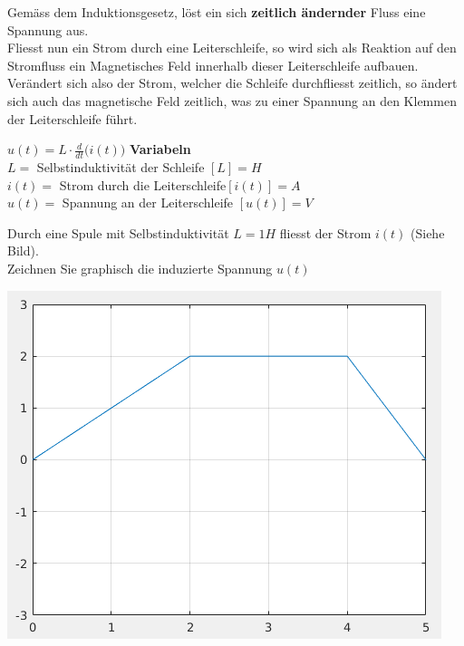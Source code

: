 \newpage



Gemäss dem Induktionsgesetz, löst ein sich \textbf{zeitlich ändernder} Fluss eine Spannung aus. \\
Fliesst nun ein Strom durch eine Leiterschleife, so wird sich als Reaktion auf den Stromfluss ein Magnetisches Feld innerhalb dieser Leiterschleife aufbauen.  \\
Verändert sich also der Strom, welcher die Schleife durchfliesst zeitlich, so ändert sich auch das magnetische Feld zeitlich, was zu einer Spannung an den Klemmen der Leiterschleife führt.

\begingl
\begin{center}

\fspace

\end{center}


\formulaBegin
$u(t) = L \cdot \frac{d}{dt}\big( i(t) \big) $
\formulaEnd
\textbf{Variabeln} \\
$L =$ Selbstinduktivität der Schleife $ [L] = H$ \\
$i(t) =$ Strom durch die Leiterschleife$ [i(t)] = A$ \\
$u(t) = $ Spannung an der Leiterschleife $[u(t)] = V$
\iend

\beginbsp
Durch eine Spule mit Selbstinduktivität $L = 1 H$ fliesst der Strom $i(t)$ (Siehe Bild). \\
Zeichnen Sie graphisch die induzierte Spannung $u(t)$
\begin{center}
  \includegraphics[scale=0.5]{img/selbstind-a1}
\end{center}

